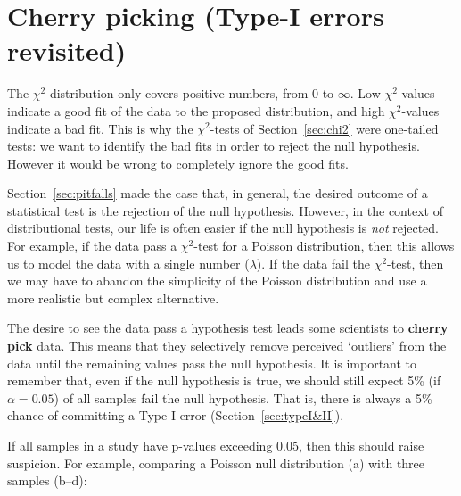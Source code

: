 \section{Cherry picking (Type-I errors revisited)}
\label{sec:cherrypicking}

The $\chi^2$-distribution only covers positive numbers, from 0 to
$\infty$. Low $\chi^2$-values indicate a good fit of the data to the
proposed distribution, and high $\chi^2$-values indicate a bad fit.
This is why the $\chi^2$-tests of Section~\ref{sec:chi2} were
one-tailed tests: we want to identify the bad fits in order to reject
the null hypothesis. However it would be wrong to completely ignore
the good fits.\medskip

Section~\ref{sec:pitfalls} made the case that, in general, the desired
outcome of a statistical test is the rejection of the null hypothesis.
However, in the context of distributional tests, our life is often
easier if the null hypothesis is \emph{not} rejected. For example, if
the data pass a $\chi^2$-test for a Poisson distribution, then this
allows us to model the data with a single number ($\lambda$). If the
data fail the $\chi^2$-test, then we may have to abandon the
simplicity of the Poisson distribution and use a more realistic but
complex alternative.\medskip

The desire to see the data pass a hypothesis test leads some
scientists to \textbf{cherry pick} data. This means that they
selectively remove perceived `outliers' from the data until the
remaining values pass the null hypothesis. It is important to remember
that, even if the null hypothesis is true, we should still expect 5\%
(if $\alpha=0.05$) of all samples fail the null hypothesis. That is,
there is always a 5\% chance of committing a Type-I error
(Section~\ref{sec:typeI&II}).\medskip

If all samples in a study have p-values exceeding 0.05, then this
should raise suspicion. For example, comparing a Poisson null
distribution (a) with three samples (b--d):

